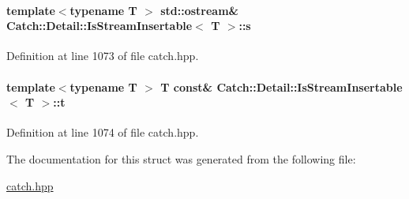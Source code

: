 \paragraph[{s}]{\setlength{\rightskip}{0pt plus 5cm}template$<$typename T $>$ std\+::ostream\& {\bf Catch\+::\+Detail\+::\+Is\+Stream\+Insertable}$<$ T $>$\+::s\hspace{0.3cm}{\ttfamily [static]}}\label{a00043_abe3d3c8e5d85665747faafffc9a96b00}


Definition at line 1073 of file catch.\+hpp.

\hypertarget{a00043_a7d2a3da978b6736667a7b2f6d51f507f}{}
\paragraph[{t}]{\setlength{\rightskip}{0pt plus 5cm}template$<$typename T $>$ T const\& {\bf Catch\+::\+Detail\+::\+Is\+Stream\+Insertable}$<$ T $>$\+::t\hspace{0.3cm}{\ttfamily [static]}}\label{a00043_a7d2a3da978b6736667a7b2f6d51f507f}


Definition at line 1074 of file catch.\+hpp.



The documentation for this struct was generated from the following file\+:\begin{DoxyCompactItemize}
\item 
\hyperlink{a00094}{catch.\+hpp}\end{DoxyCompactItemize}

